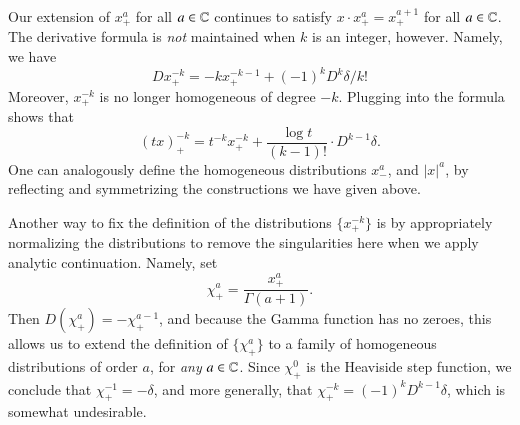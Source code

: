\begin{example}
    Our extension of $x^a_+$ for all $a \in \operatorname{\mathbb{C}}$ continues to satisfy $x \cdot x^a_+ = x^{a+1}_+$ for all $a \in \operatorname{\mathbb{C}}$. The derivative formula is \emph{not} maintained when $k$ is an integer, however. Namely, we have
    \[ D x^{-k}_+ = -k x^{-k-1}_+ + (-1)^k D^k \delta / k! \]
    Moreover, $x^{-k}_+$ is no longer homogeneous of degree $-k$. Plugging into the formula shows that
    \[ (tx)^{-k}_+ = t^{-k} x^{-k}_+ + \frac{\log t}{(k-1)!} \cdot D^{k-1} \delta. \]
    One can analogously define the homogeneous distributions $x^a_-$, and $|x|^a$, by reflecting and symmetrizing the constructions we have given above.
\end{example}

\begin{example}
    Another way to fix the definition of the distributions $\{ x^{-k}_+ \}$ is by appropriately normalizing the distributions to remove the singularities here when we apply analytic continuation. Namely, set
    \[ \chi^a_+ = \frac{x^a_+}{\Gamma(a+1)}. \]
    Then $D(\chi^a_+) = - \chi^{a-1}_+$, and because the Gamma function has no zeroes, this allows us to extend the definition of $\{ \chi^a_+ \}$ to a family of homogeneous distributions of order $a$, for \emph{any} $a \in \operatorname{\mathbb{C}}$. Since $\chi^0_+$ is the Heaviside step function, we conclude that $\chi^{-1}_+ = - \delta$, and more generally, that $\chi_+^{-k} = (-1)^k D^{k-1} \delta$, which is somewhat undesirable.
\end{example}

